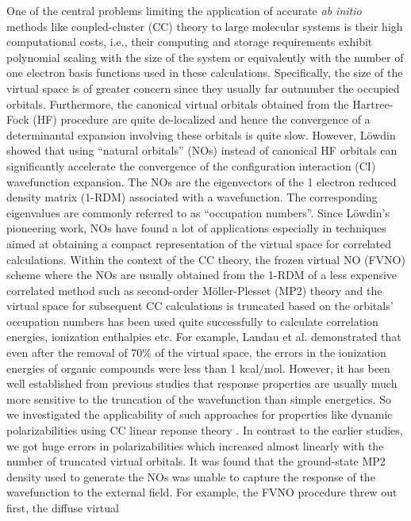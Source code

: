 One of the central problems limiting the application of accurate {\em ab
initio} methods like coupled-cluster (CC) theory to large molecular systems is their high 
computational costs, i.e., their computing and storage requirements 
exhibit polynomial scaling with the size of the system or equivalently
with the number of one electron basis functions used in these calculations.
Specifically, the size of the virtual space is of greater concern since  
they usually far outnumber the occupied orbitals. Furthermore, the canonical virtual orbitals
obtained from the Hartree-Fock (HF) procedure are quite de-localized and hence 
the convergence of a determinantal expansion involving these orbitals
is quite slow. However, L{\"o}wdin \cite{}showed that using 
``natural orbitals'' (NOs) instead of canonical HF orbitals can significantly 
accelerate the convergence of the configuration interaction (CI)
wavefunction expansion. The NOs are the eigenvectors of the 
1 electron reduced density matrix (1-RDM) associated with a wavefunction. 
The corresponding eigenvalues are commonly referred to 
as ``occupation numbers''. Since L{\"o}wdin's pioneering 
work, NOs have found a lot of applications especially in techniques 
aimed at obtaining a compact representation of the virtual space for 
correlated calculations.\cite{} Within the context of the CC theory,
the frozen virtual NO (FVNO) scheme where the NOs are usually obtained from 
the 1-RDM of a less expensive correlated method such as second-order 
M{\"o}ller-Plesset (MP2) theory and the virtual space for subsequent 
CC calculations is truncated based on the orbitals' occupation 
numbers has been used quite successfully to calculate correlation energies, 
ionization enthalpies etc\cite{}. For example, Landau et al.\cite{} demonstrated 
that even after the removal of 70\% of the virtual space, the errors in
the ionization energies of organic compounds were less than 1 kcal/mol.
However, it has been well established from previous studies that response 
properties are usually much more sensitive to the truncation of the wavefunction 
than simple energetics\cite{}. So we investigated the applicability of such 
approaches for properties like dynamic polarizabilities using CC linear reponse theory
\cite{}. In contrast to the earlier studies, we got huge errors in polarizabilities 
which increased almost linearly with the number of truncated virtual orbitals. 
It was found that the ground-state MP2 density used to generate the NOs was 
unable to capture the response of the wavefunction to the external field. 
For example, the FVNO procedure threw out first, the diffuse virtual 
